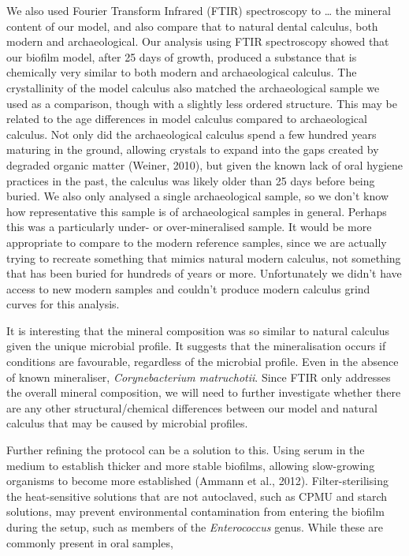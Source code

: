 \documentclass[
  letterpaper,
]{book}
\begin{document}
We also used Fourier Transform Infrared (FTIR) spectroscopy to \ldots{}
the mineral content of our model, and also compare that to natural
dental calculus, both modern and archaeological. Our analysis using FTIR
spectroscopy showed that our biofilm model, after 25 days of growth,
produced a substance that is chemically very similar to both modern and
archaeological calculus. The crystallinity of the model calculus also
matched the archaeological sample we used as a comparison, though with a
slightly less ordered structure. This may be related to the age
differences in model calculus compared to archaeological calculus. Not
only did the archaeological calculus spend a few hundred years maturing
in the ground, allowing crystals to expand into the gaps created by
degraded organic matter (Weiner, 2010), but given the known lack of oral
hygiene practices in the past, the calculus was likely older than 25
days before being buried. We also only analysed a single archaeological
sample, so we don't know how representative this sample is of
archaeological samples in general. Perhaps this was a particularly
under- or over-mineralised sample. It would be more appropriate to
compare to the modern reference samples, since we are actually trying to
recreate something that mimics natural modern calculus, not something
that has been buried for hundreds of years or more. Unfortunately we
didn't have access to new modern samples and couldn't produce modern
calculus grind curves for this analysis.

It is interesting that the mineral composition was so similar to natural
calculus given the unique microbial profile. It suggests that the
mineralisation occurs if conditions are favourable, regardless of the
microbial profile. Even in the absence of known mineraliser,
\emph{Corynebacterium matruchotii}. Since FTIR only addresses the
overall mineral composition, we will need to further investigate whether
there are any other structural/chemical differences between our model
and natural calculus that may be caused by microbial profiles.

Further refining the protocol can be a solution to this. Using serum in
the medium to establish thicker and more stable biofilms, allowing
slow-growing organisms to become more established (Ammann et al., 2012).
Filter-sterilising the heat-sensitive solutions that are not autoclaved,
such as CPMU and starch solutions, may prevent environmental
contamination from entering the biofilm during the setup, such as
members of the \emph{Enterococcus} genus. While these are commonly
present in oral samples,
\end{document}
